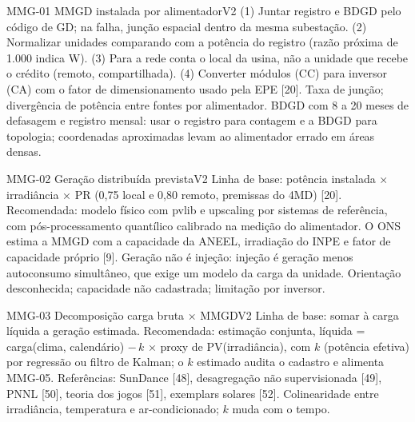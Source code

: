 \begin{ficha}{MMG-01 \textperiodcentered{} MMGD instalada por alimentador}{V2}
 (1) Juntar registro e BDGD pelo código de GD; na falha,
junção espacial dentro da mesma subestação. (2) Normalizar unidades
comparando com a potência do registro (razão próxima de 1.000 indica W). (3)
Para a rede conta o local da usina, não a unidade que recebe o crédito
(remoto, compartilhada). (4) Converter módulos (CC) para inversor (CA) com o
fator de dimensionamento usado pela EPE [20].
 Taxa de junção; divergência de potência entre fontes por
alimentador.
 BDGD com 8 a 20 meses de defasagem e registro mensal: usar o
registro para contagem e a BDGD para topologia; coordenadas aproximadas levam
ao alimentador errado em áreas densas.
\end{ficha}

\begin{ficha}{MMG-02 \textperiodcentered{} Geração distribuída prevista}{V2}
 Linha de base: potência instalada × irradiância × PR (0,75
local e 0,80 remoto, premissas do 4MD) [20]. Recomendada: modelo físico com
pvlib e upscaling por sistemas de referência, com pós-processamento
quantílico calibrado na medição do alimentador. O ONS estima a MMGD com a
capacidade da ANEEL, irradiação do INPE e fator de capacidade próprio [9].
 Geração não é injeção: injeção é geração menos
autoconsumo simultâneo, que exige um modelo da carga da unidade.
 Orientação desconhecida; capacidade não cadastrada;
limitação por inversor.
\end{ficha}

\begin{ficha}{MMG-03 \textperiodcentered{} Decomposição carga bruta × MMGD}{V2}
 Linha de base: somar à carga líquida a geração estimada.
Recomendada: estimação conjunta, líquida = carga(clima, calendário) $-\,k$ ×
proxy de PV(irradiância), com $k$ (potência efetiva) por regressão ou filtro
de Kalman; o $k$ estimado audita o cadastro e alimenta MMG-05. Referências:
SunDance [48], desagregação não supervisionada [49], PNNL [50], teoria dos
jogos [51], exemplars solares [52].
 Colinearidade entre irradiância, temperatura e
ar-condicionado; $k$ muda com o tempo.
\end{ficha}

